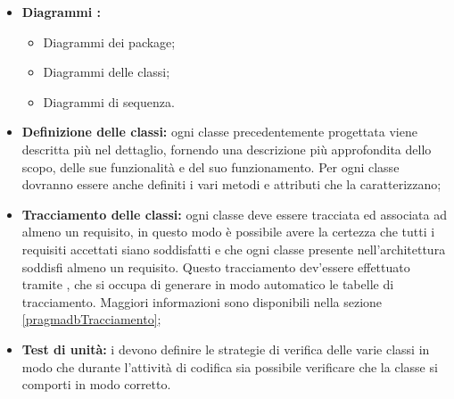 \begin{itemize}
\item \textbf{Diagrammi :}
\begin{itemize}
\item Diagrammi dei package;
\item Diagrammi delle classi;
\item Diagrammi di sequenza.
\end{itemize}
\item \textbf{Definizione delle classi:} ogni classe precedentemente progettata viene descritta più nel dettaglio, fornendo una descrizione più approfondita dello scopo, delle sue funzionalità e del suo funzionamento. Per ogni classe dovranno essere anche definiti i vari metodi e attributi che la caratterizzano;
\item \textbf{Tracciamento delle classi:} ogni classe deve essere tracciata ed associata ad almeno un requisito, in questo modo è possibile avere la certezza che tutti i requisiti accettati siano soddisfatti e che ogni classe presente nell'architettura soddisfi almeno un requisito. Questo tracciamento dev'essere effettuato tramite \pragmadb, che si occupa di generare in modo automatico le tabelle di tracciamento. Maggiori informazioni sono disponibili nella sezione \ref{pragmadbTracciamento};
\item \textbf{Test di unità:} i \rPs devono definire le strategie di verifica delle varie classi in modo che durante l'attività di codifica sia possibile verificare che la classe si comporti in modo corretto.
\end{itemize}
